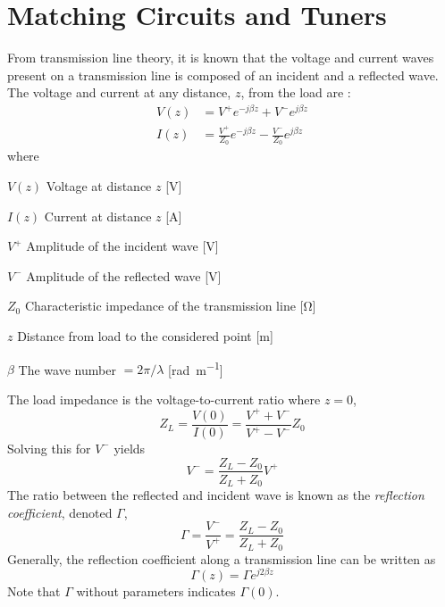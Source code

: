 \section{Matching Circuits and Tuners}
\label{sec:tuners}

From transmission line theory, it is known that the voltage and current waves present on a transmission line is composed of an incident and a reflected wave. The voltage and current at any distance, $z$, from the load are \cite{pozar2011microwave}:
\begin{align}
    V(z) &= V^+e^{-j\beta z} + V^-e^{j\beta z}\\
    I(z) &= \frac{V^+}{Z_0} e^{-j\beta z} - \frac{V^-}{Z_0} e^{j\beta z}
\end{align}
where
\begin{where}
\item[$V(z)$] Voltage at distance $z$ [\si{V}]
\item[$I(z)$] Current at distance $z$ [\si{A}]
\item[$V^+$] Amplitude of the incident wave [\si{V}]
\item[$V^-$] Amplitude of the reflected wave [\si{V}]
\item[$Z_0$] Characteristic impedance of the transmission line [\si{\ohm}]
\item[$z$] Distance from load to the considered point [\si{m}]
\item[$\beta$] The wave number $=2\pi/\lambda$ [\si{rad\per m}]
\end{where}
The load impedance is the voltage-to-current ratio where $z=0$,
\begin{equation}
    Z_L = \frac{V(0)}{I(0)} = \frac{V^+ + V^-}{V^+ - V^-}Z_0
\end{equation}
Solving this for $V^-$ yields
\begin{equation}
    V^- = \frac{Z_L - Z_0}{Z_L + Z_0} V^+
\end{equation}
The ratio between the reflected and incident wave is known as the \emph{reflection coefficient}, denoted $\Gamma$,
\begin{equation}
    \label{eq:reflect}
    \Gamma = \frac{V^-}{V^+} = \frac{Z_L-Z_0}{Z_L+Z_0}
\end{equation}
Generally, the reflection coefficient along a transmission line can be written as \cite{ebert1998transmission}
\begin{equation}
    \Gamma(z) = \Gamma e^{j2\beta z}
\end{equation}
Note that $\Gamma$ without parameters indicates $\Gamma(0)$.

